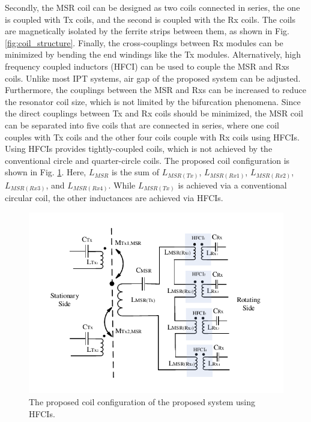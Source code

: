 \documentclass[journal]{IEEEtran}
\begin{document}
Secondly, the MSR coil can be designed as two coils connected in series, the one is coupled with Tx coils, and the second is coupled with the Rx coils. The coils are magnetically isolated by the ferrite strips between them, as shown in Fig.  \ref{fig:coil_structure}.
Finally, the cross-couplings between Rx modules can be minimized by bending the end windings like the Tx modules. 
Alternatively, high frequency coupled inductors (HFCI) can be used to couple the MSR and Rxs coils.
Unlike most IPT systems,  air gap of the proposed system can be adjusted.
Furthermore, the couplings between the MSR and Rxs can be increased to reduce the resonator coil size, which is not limited by the bifurcation phenomena.
Since the direct couplings between Tx and Rx coils should be minimized,  the MSR coil can be separated into five coils that are connected in series, where one coil couples with Tx coils and the other four coils couple with Rx coils using HFCIs. 
Using HFCIs provides tightly-coupled coils, which is not achieved by the conventional circle and quarter-circle coils.   
The proposed coil configuration is shown in Fig. \ref{fig:HFCI_anlatim}.
Here, $L_{MSR}$ is the sum of $L_{MSR(Tx)}$, $L_{MSR(Rx1)}$, $L_{MSR(Rx2)}$, $L_{MSR(Rx3)}$, and $L_{MSR(Rx4)}$. While  $L_{MSR(Tx)}$ is achieved via a conventional circular coil, the other inductances are achieved via HFCIs.

\begin{figure}[h!]
    \centering
    \includegraphics[width=1\linewidth]{HFCI_anlatim.pdf}
    \caption{The proposed coil configuration of the proposed system using HFCIs.}
    \label{fig:HFCI_anlatim}
\end{figure}
\end{document}
